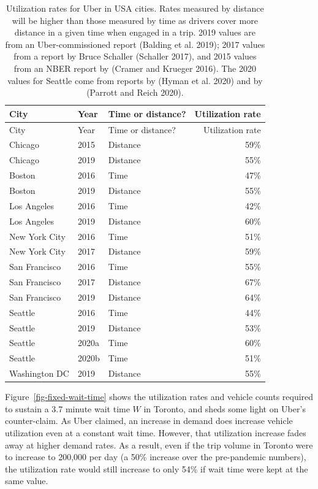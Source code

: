 \documentclass[
  letterpaper,
  DIV=11,
  numbers=noendperiod]{scrartcl}
\begin{document}
\hypertarget{tbl-utilization}{}
\begin{longtable}[]{@{}lllr@{}}
\caption{\label{tbl-utilization}Utilization rates for Uber in USA
cities. Rates measured by distance will be higher than those measured by
time as drivers cover more distance in a given time when engaged in a
trip. 2019 values are from an Uber-commissioned report (Balding et al.
2019); 2017 values from a report by Bruce Schaller (Schaller 2017), and
2015 values from an NBER report by (Cramer and Krueger 2016). The 2020
values for Seattle come from reports by (Hyman et al. 2020) and by
(Parrott and Reich 2020).}\tabularnewline
\toprule()
City & Year & Time or distance? & Utilization rate \\
\midrule()
\endfirsthead
\toprule()
City & Year & Time or distance? & Utilization rate \\
\midrule()
\endhead
Chicago & 2015 & Distance & 59\% \\
Chicago & 2019 & Distance & 55\% \\
Boston & 2016 & Time & 47\% \\
Boston & 2019 & Distance & 55\% \\
Los Angeles & 2016 & Time & 42\% \\
Los Angeles & 2019 & Distance & 60\% \\
New York City & 2016 & Time & 51\% \\
New York City & 2017 & Distance & 59\% \\
San Francisco & 2016 & Time & 55\% \\
San Francisco & 2017 & Distance & 67\% \\
San Francisco & 2019 & Distance & 64\% \\
Seattle & 2016 & Time & 44\% \\
Seattle & 2019 & Distance & 53\% \\
Seattle & 2020a & Time & 60\% \\
Seattle & 2020b & Time & 51\% \\
Washington DC & 2019 & Distance & 55\% \\
\bottomrule()
\end{longtable}

Figure~\ref{fig-fixed-wait-time} shows the utilization rates and vehicle
counts required to sustain a 3.7 minute wait time \(W\) in Toronto, and
sheds some light on Uber's counter-claim. As Uber claimed, an increase
in demand does increase vehicle utilization even at a constant wait
time. However, that utilization increase fades away at higher demand
rates. As a result, even if the trip volume in Toronto were to increase
to 200,000 per day (a 50\% increase over the pre-pandemic numbers), the
utilization rate would still increase to only 54\% if wait time were
kept at the same value.
\end{document}
